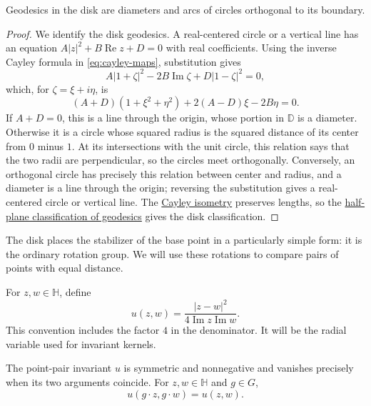 \begin{proposition}\label{hyperbolic.disk-geodesics}
Geodesics in the disk are diameters and arcs of circles orthogonal to its boundary.
\end{proposition}

\begin{proof}
We identify the disk geodesics. A real-centered circle or a vertical line has an equation $A|z|^2+B\operatorname{Re}z+D=0$ with real coefficients. Using the inverse Cayley formula in \eqref{eq:cayley-maps}, substitution gives
\[
 A|1+\zeta|^2-2B\operatorname{Im}\zeta+D|1-\zeta|^2=0,
\]
which, for $\zeta=\xi+i\eta$, is
\[
 (A+D)(1+\xi^2+\eta^2)+2(A-D)\xi-2B\eta=0.
\]
If $A+D=0$, this is a line through the origin, whose portion in $\mathbb D$ is a diameter. Otherwise it is a circle whose squared radius is the squared distance of its center from $0$ minus $1$. At its intersections with the unit circle, this relation says that the two radii are perpendicular, so the circles meet orthogonally. Conversely, an orthogonal circle has precisely this relation between center and radius, and a diameter is a line through the origin; reversing the substitution gives a real-centered circle or vertical line. The \hyperref[hyperbolic.disk-metric]{Cayley isometry} preserves lengths, so the \hyperref[hyperbolic.geodesics]{half-plane classification of geodesics} gives the disk classification.
\end{proof}

The disk places the stabilizer of the base point in a particularly simple form: it is the ordinary rotation group. We will use these rotations to compare pairs of points with equal distance.

\begin{definition}\label{hyperbolic.point-pair}
For $z,w\in\mathbb H$, define
\begin{equation}\label{eq:point-pair-definition}
 u(z,w)=\frac{|z-w|^2}{4\operatorname{Im}z\operatorname{Im}w}.
\end{equation}
This convention includes the factor $4$ in the denominator. It will be the radial variable used for invariant kernels.
\end{definition}

\begin{proposition}\label{hyperbolic.point-pair-properties}
The point-pair invariant $u$ is symmetric and nonnegative and vanishes precisely when its two arguments coincide. For $z,w\in\mathbb H$ and $g\in G$,
\begin{equation}\label{eq:point-pair-invariance}
 u(g\cdot z,g\cdot w)=u(z,w).
\end{equation}
\end{proposition}


